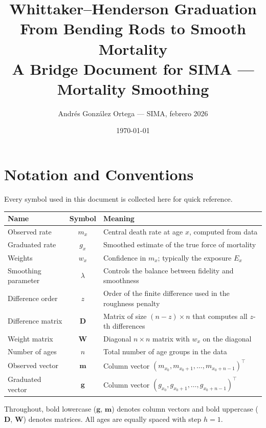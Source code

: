 \documentclass[11pt,a4paper]{article}
\title{%
  \textbf{Whittaker--Henderson Graduation}\\[6pt]
  \Large From Bending Rods to Smooth Mortality\\[4pt]
  \large A Bridge Document for SIMA --- Mortality Smoothing%
}
\author{Andr\'{e}s Gonz\'{a}lez Ortega --- SIMA, febrero 2026}
\date{\today}
\begin{document}
\maketitle
\tableofcontents
\newpage

\section{Notation and Conventions}

Every symbol used in this document is collected here for quick reference.

\begin{center}
\renewcommand{\arraystretch}{1.35}
\begin{tabular}{>{\raggedright}p{2.8cm} c p{7cm}}
\toprule
\textbf{Name} & \textbf{Symbol} & \textbf{Meaning} \\
\midrule
Observed rate      & $m_x$      & Central death rate at age $x$, computed from data \\
Graduated rate     & $g_x$      & Smoothed estimate of the true force of mortality \\
Weights            & $w_x$      & Confidence in $m_x$; typically the exposure $E_x$ \\
Smoothing parameter & $\lambda$ & Controls the balance between fidelity and smoothness \\
Difference order   & $z$        & Order of the finite difference used in the roughness penalty \\
Difference matrix  & $\bm{D}$   & Matrix of size $(n-z)\times n$ that computes all $z$-th differences \\
Weight matrix      & $\bm{W}$   & Diagonal $n\times n$ matrix with $w_x$ on the diagonal \\
Number of ages     & $n$        & Total number of age groups in the data \\
Observed vector    & $\bm{m}$   & Column vector $(m_{x_0}, m_{x_0+1}, \ldots, m_{x_0+n-1})^\top$ \\
Graduated vector   & $\bm{g}$   & Column vector $(g_{x_0}, g_{x_0+1}, \ldots, g_{x_0+n-1})^\top$ \\
\bottomrule
\end{tabular}
\end{center}

Throughout, bold lowercase ($\bm{g}$, $\bm{m}$) denotes column vectors and bold uppercase ($\bm{D}$, $\bm{W}$) denotes matrices.  All ages are equally spaced with step $h=1$.
\end{document}
